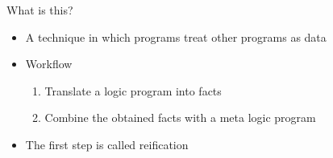 \begin{frame}{What is this?}
  \bigskip
  \begin{itemize}
  \item A technique in which programs treat other programs as data
    \bigskip
  \item<2-> Workflow
    \begin{enumerate}\normalsize
    \item Translate a logic program into facts
    \item Combine the obtained facts with a meta logic program
    \end{enumerate}
    \medskip
  \item<3-> The first step is called \alert{reification}
  \end{itemize}
\end{frame}
%
